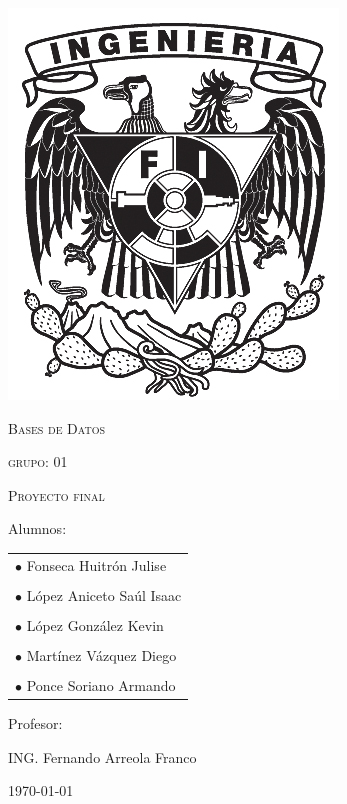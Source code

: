 \documentclass[12pt,letterpaper]{article}
\begin{document}
\begin{titlepage}
\begin{minipage}{0.14\linewidth}
			\includegraphics[width=\linewidth]{img/shieldFi}
		\end{minipage}
		
		\centering
		\vspace{1.5cm}
		{\scshape\Large Bases de Datos \par}
		{\scshape\Large grupo: 01\par}
		\vspace{3cm}
		{\scshape\Huge Proyecto final \par}
		\vspace{0.8cm}
		\vfill
		{\Large Alumnos: \par}
		\begin{center}
			\begin{tabular}{l}
				$\bullet$ {\Large Fonseca Huitrón Julise}\\
				\\
				$\bullet$ {\Large López Aniceto Saúl Isaac }\\
				\\
				$\bullet$ {\Large López González Kevin } \\
				\\
				$\bullet$ {\Large Martínez Vázquez Diego}\\
				\\
				$\bullet$ {\Large Ponce Soriano Armando }\\
			\end{tabular}
		\end{center}
		\vfill
		{\Large Profesor: \par}
		{\Large ING. Fernando Arreola Franco \par}
		\vfill
		{\Large \today \par}
	\end{titlepage}
\end{document}
